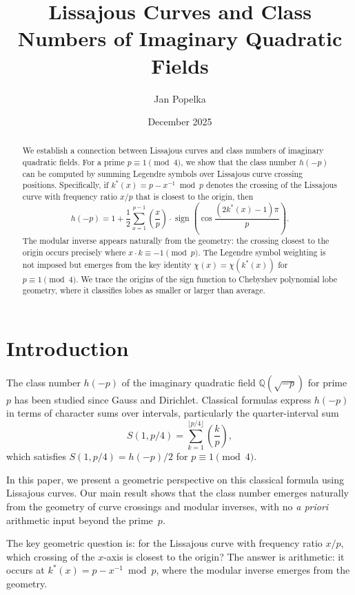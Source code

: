 \documentclass[11pt,a4paper]{article}
\title{Lissajous Curves and Class Numbers of Imaginary Quadratic Fields}
\author{Jan Popelka}
\date{December 2025}
\begin{document}
\maketitle

\begin{abstract}
We establish a connection between Lissajous curves and class numbers of imaginary quadratic fields. For a prime $p \equiv 1 \pmod 4$, we show that the class number $h(-p)$ can be computed by summing Legendre symbols over Lissajous curve crossing positions. Specifically, if $k^*(x) = p - x^{-1} \bmod p$ denotes the crossing of the Lissajous curve with frequency ratio $x/p$ that is closest to the origin, then
\[
h(-p) = 1 + \frac{1}{2} \sum_{x=1}^{p-1} \left(\frac{x}{p}\right) \cdot \operatorname{sign}\left(\cos\frac{(2k^*(x)-1)\pi}{p}\right).
\]
The modular inverse appears naturally from the geometry: the crossing closest to the origin occurs precisely where $x \cdot k \equiv -1 \pmod p$. The Legendre symbol weighting is not imposed but emerges from the key identity $\chi(x) = \chi(k^*(x))$ for $p \equiv 1 \pmod 4$. We trace the origins of the sign function to Chebyshev polynomial lobe geometry, where it classifies lobes as smaller or larger than average.
\end{abstract}

\section{Introduction}

The class number $h(-p)$ of the imaginary quadratic field $\mathbb{Q}(\sqrt{-p})$ for prime $p$ has been studied since Gauss and Dirichlet. Classical formulas express $h(-p)$ in terms of character sums over intervals, particularly the quarter-interval sum
\[
S(1, p/4) = \sum_{k=1}^{\lfloor p/4 \rfloor} \left(\frac{k}{p}\right),
\]
which satisfies $S(1, p/4) = h(-p)/2$ for $p \equiv 1 \pmod 4$.

In this paper, we present a geometric perspective on this classical formula using Lissajous curves. Our main result shows that the class number emerges naturally from the geometry of curve crossings and modular inverses, with no \emph{a priori} arithmetic input beyond the prime~$p$.

The key geometric question is: for the Lissajous curve with frequency ratio $x/p$, which crossing of the $x$-axis is closest to the origin? The answer is arithmetic: it occurs at $k^*(x) = p - x^{-1} \bmod p$, where the modular inverse emerges from the geometry.
\end{document}
